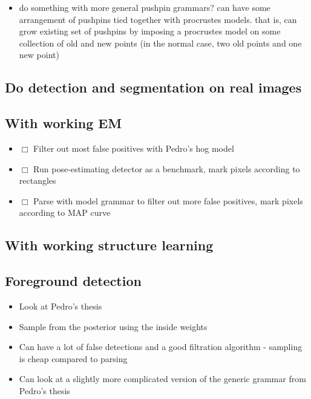 \documentclass{book}
\begin{document}
\begin{itemize}
\item do something with more general pushpin grammars? can have some
    arrangement of pushpins tied together with procrustes models. that
    is, can grow existing set of pushpins by imposing a procrustes
    model on some collection of old and new points (in the normal
    case, two old points and one new point)
\end{itemize}
\subsection{Do detection and segmentation on real images}
\label{sec-5_29_12}
\subsection{With working EM}
\label{sec-5_29_13}

\begin{itemize}
\item $\Box$ Filter out most false positives with Pedro's hog model
\item $\Box$ Run pose-estimating detector as a benchmark, mark pixels according to rectangles
\item $\Box$ Parse with model grammar to filter out more false positives, mark pixels according to MAP curve
\end{itemize}
\subsection{With working structure learning}
\label{sec-5_29_14}
\subsection{Foreground detection}
\label{sec-5_29_15}


\begin{itemize}
\item Look at Pedro's thesis
\item Sample from the posterior using the inside weights
\item Can have a lot of false detections and a good filtration
   algorithm - sampling is cheap compared to parsing
\item Can look at a slightly more complicated version of the generic grammar from Pedro's thesis
\end{itemize}
\end{document}
